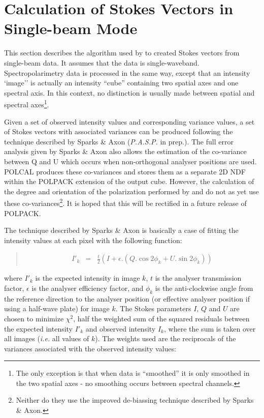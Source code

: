\documentclass[twoside,11pt]{starlink}
\newenvironment{myquote}{\begin{quote}\begin{small}}{\end{small}\end{quote}}
\begin{document}
\section{\label{APP:SNGBM}
Calculation of Stokes Vectors in Single-beam Mode}

This section describes the algorithm used by  to
created Stokes vectors from single-beam data. It assumes that the data is
single-waveband. Spectropolarimetry data is processed in the same way,
except that an intensity `image'' is actually an intensity ``cube''
containing two spatial axes and one spectral axis. In this context, no
distinction is usually made between spatial and spectral axes\footnote{
The only exception is that when data is ``smoothed'' it is only smoothed
in the two spatial axes - no smoothing occurs between spectral channels.}.

Given a set of observed intensity values and corresponding variance values,
a set of Stokes vectors with associated variances can be produced
following the technique described by Sparks \& Axon (\emph{P.A.S.P.} in
prep.). The full error analysis given by Sparks \& Axon also allows the
estimation of the co-variance between Q and U which occurs when
non-orthogonal analyser positions are used. POLCAL produces these
co-variances and stores them as a separate 2D NDF within the POLPACK
extension of the output cube. However, the calculation of the degree and
orientation of the polarization performed by  and
 do not as yet use these co-variances\footnote{Neither
do they use the improved de-biassing technique described by Sparks \&
Axon.}. It is hoped that this will be rectified in a future release of
POLPACK.

The technique described by Sparks \& Axon is basically a case of fitting
the intensity values at each pixel with the following function:

\begin{myquote}
\begin{eqnarray}
  \label{EQN:IEXP}
  I'_{k} & = & \frac{t}{2}( I + \epsilon.( Q.\cos 2\phi_{k} + U.\sin 2\phi_{k} ) )
\end{eqnarray}
\end{myquote}

where $I'_{k}$ is the expected intensity in image $k$, $t$ is the analyser
transmission factor, $\epsilon$ is the analyser efficiency factor, and
$\phi_{k}$ is the anti-clockwise angle from the reference direction to the
analyser position (or effective analyser position if using a half-wave
plate) for image $k$. The Stokes parameters $I$, $Q$ and $U$ are chosen
to minimize $\chi^2$, half the weighted sum of the squared residuals between
the expected intensity $I'_{k}$ and observed intensity $I_{k}$, where the sum is taken over all images
(\emph{i.e.} all values of $k$). The weights used are the reciprocals of
the variances associated with the observed intensity values:
\end{document}
